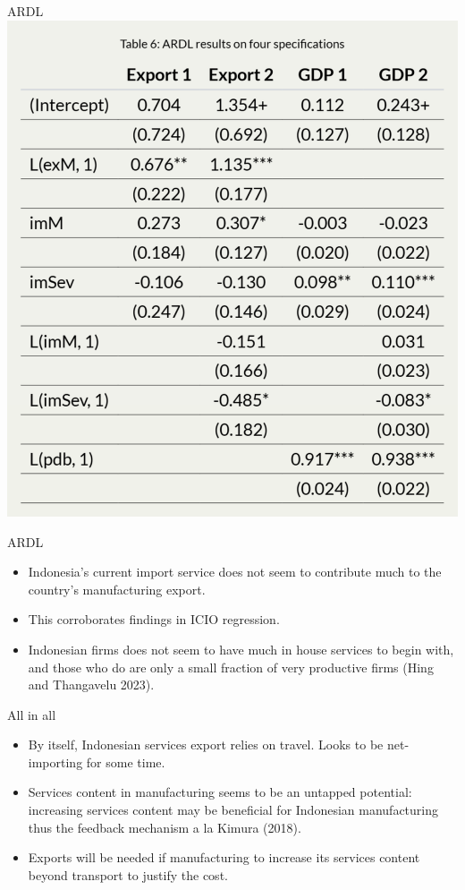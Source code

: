 \documentclass[
  ignorenonframetext,
]{beamer}
\begin{document}
\begin{frame}{ARDL}
\label{ardl-3}
\includegraphics{plot/slides/ardl_services.png}
\end{frame}

\begin{frame}{ARDL}
\label{ardl-4}
\begin{itemize}
\item
  Indonesia's current import service does not seem to contribute much to
  the country's manufacturing export.
\item
  This corroborates findings in ICIO regression.
\item
  Indonesian firms does not seem to have much in house services to begin
  with, and those who do are only a small fraction of very productive
  firms (Hing and Thangavelu 2023).
\end{itemize}
\end{frame}

\begin{frame}{All in all}
\label{all-in-all-1}
\begin{itemize}
\item
  By itself, Indonesian services export relies on travel. Looks to be
  net-importing for some time.
\item
  Services content in manufacturing seems to be an untapped potential:
  increasing services content may be beneficial for Indonesian
  manufacturing thus the feedback mechanism a la Kimura (2018).
\item
  Exports will be needed if manufacturing to increase its services
  content beyond transport to justify the cost.
\end{itemize}
\end{frame}
\end{document}
